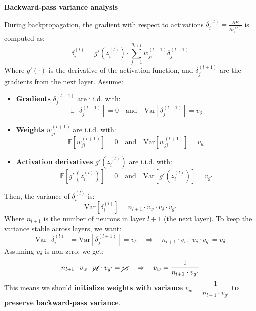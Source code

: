 \highspace
\begin{flushleft}
    \textcolor{Green3}{ \textbf{Backward-pass variance analysis}}
\end{flushleft}
During backpropagation, the gradient with respect to activations $\delta_i^{(l)} = \frac{\partial E}{\partial z_i^{(l)}}$ is computed as:
\begin{equation*}
    \delta_i^{(l)} = g'\left(z_i^{(l)}\right) \cdot \sum_{j=1}^{n_{l+1}} w_{ji}^{(l+1)} \delta_j^{(l+1)}
\end{equation*}
Where $g'(\cdot)$ is the derivative of the activation function, and $\delta_j^{(l+1)}$ are the gradients from the next layer. Assume:
\begin{itemize}
    \item \textbf{Gradients} $\delta_j^{(l+1)}$ are i.i.d. with:
    \begin{equation*}
        \mathbb{E}\left[\delta_j^{(l+1)}\right] = 0 \quad \text{and} \quad \mathrm{Var}\left[\delta_j^{(l+1)}\right] = v_\delta
    \end{equation*}
    \item \textbf{Weights} $w_{ji}^{(l+1)}$ are i.i.d. with:
    \begin{equation*}
        \mathbb{E}\left[w_{ji}^{(l+1)}\right] = 0 \quad \text{and} \quad \mathrm{Var}\left[w_{ji}^{(l+1)}\right] = v_w
    \end{equation*}
    \item \textbf{Activation derivatives} $g'\left(z_i^{(l)}\right)$ are i.i.d. with:
    \begin{equation*}
        \mathbb{E}\left[g'\left(z_i^{(l)}\right)\right] = 0 \quad \text{and} \quad \mathrm{Var}\left[g'\left(z_i^{(l)}\right)\right] = v_{g'}
    \end{equation*}
\end{itemize}
Then, the variance of $\delta_i^{(l)}$ is:
\begin{equation*}
    \mathrm{Var}\left[\delta_i^{(l)}\right] = n_{l+1} \cdot v_w \cdot v_\delta \cdot v_{g'}
\end{equation*}
Where $n_{l+1}$ is the number of neurons in layer $l+1$ (the next layer). To keep the variance stable across layers, we want:
\begin{equation*}
    \mathrm{Var}\left[\delta_i^{(l)}\right] = \mathrm{Var}\left[\delta_j^{(l+1)}\right] = v_\delta \quad \Rightarrow \quad n_{l+1} \cdot v_w \cdot v_\delta \cdot v_{g'} = v_\delta
\end{equation*}
Assuming $v_\delta$ is non-zero, we get:
\begin{equation}\label{eq:backward-variance}
    n_{l+1} \cdot v_w \cdot \cancel{v_\delta} \cdot v_{g'} = \cancel{v_\delta} \quad \Rightarrow \quad v_w = \dfrac{1}{n_{l+1} \cdot v_{g'}}
\end{equation}
This means we should \textbf{initialize weights with variance} $v_w = \dfrac{1}{n_{l+1} \cdot v_{g'}}$ \textbf{to preserve backward-pass variance}.

